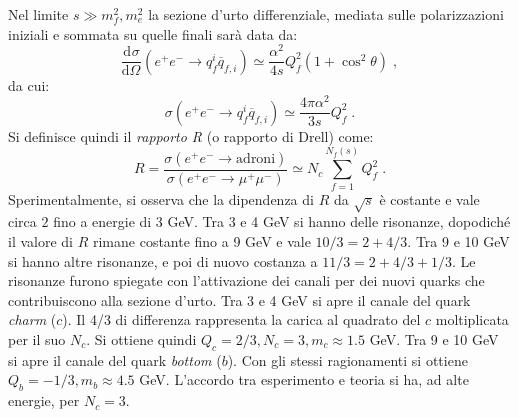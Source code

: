 \documentclass[12pt,a4paper]{article}
\theoremstyle{definition}
\newcommand{\dev}[3][]{\frac{\mathrm{d}^{#1} #2}{\mathrm{d} #3^{#1}}}
\numberwithin{equation}{section}
\begin{document}
\begin{enumerate}
Nel limite $s\gg m_f^2,m_e^2$ la sezione d'urto differenziale, mediata sulle polarizzazioni iniziali e sommata su quelle finali sarà data da:
\begin{equation}
\dev{\sigma}{\Omega}(e^+e^-\to q_f^i\overline{q}_{f,i})\simeq \frac{\alpha^2}{4s}Q_f^2(1+\cos^2\theta)\;,
\end{equation}
da cui:
\begin{equation}
\sigma(e^+e^-\to q_f^i\overline{q}_{f,i})\simeq \frac{4\pi\alpha^2}{3s}Q_f^2\;.
\end{equation}
Si definisce quindi il \emph{rapporto R} (o rapporto di Drell) come:
\begin{equation}
R=\frac{\sigma(e^+e^-\to\mbox{adroni})}{\sigma(e^+e^-\to\mu^+\mu^-)}\simeq N_c\sum_{f=1}^{N_f(s)}Q_f^2\;.
\end{equation}
Sperimentalmente, si osserva che la dipendenza di $R$ da $\sqrt{s}$ è costante e vale circa $2$ fino a energie di 3 GeV. Tra 3 e 4 GeV si hanno delle risonanze, dopodiché il valore di $R$ rimane costante fino a 9 GeV e vale $10/3=2+4/3$. Tra 9 e 10 GeV si hanno altre risonanze, e poi di nuovo costanza a $11/3=2+4/3+1/3$. Le risonanze furono spiegate con l'attivazione dei canali per dei nuovi quarks che contribuiscono alla sezione d'urto. Tra 3 e 4 GeV si apre il canale del quark \emph{charm} ($c$). Il 4/3 di differenza rappresenta la carica al quadrato del $c$ moltiplicata per il suo $N_c$. Si ottiene quindi $Q_c=2/3,N_c=3, m_c\approx 1.5$ GeV. Tra 9 e 10 GeV si apre il canale del quark \emph{bottom} ($b$). Con gli stessi ragionamenti si ottiene $Q_b=-1/3, m_b\approx 4.5$ GeV. L'accordo tra esperimento e teoria si ha, ad alte energie, per $N_c=3$.
\end{enumerate}
\cleardoublepage
\end{document}
